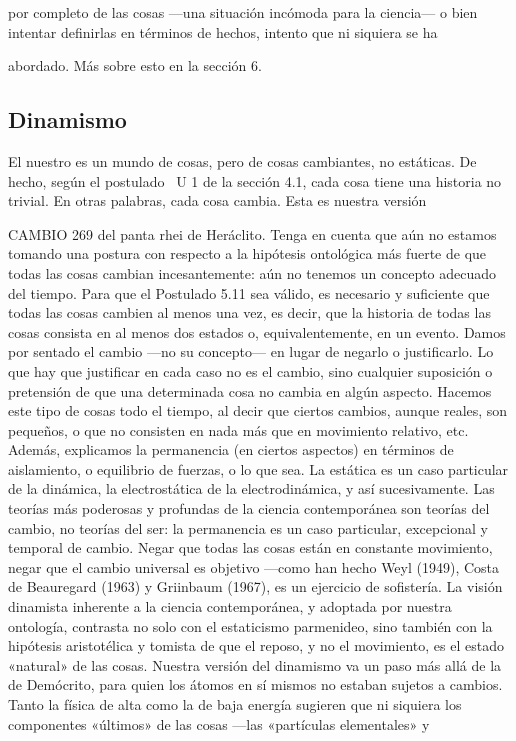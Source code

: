 \begin{justifying}
  por completo de las cosas —una situación incómoda para la ciencia— o bien intentar
  definirlas en términos de hechos, intento que ni siquiera se ha

  abordado. Más sobre esto en la sección 6.

      \noindent 
  \bigskip
  \subsection{Dinamismo}

  El nuestro es un mundo de cosas, pero de cosas cambiantes, no estáticas.
  De hecho, según el postulado ~U 1 de la sección 4.1, cada cosa tiene una
  historia no trivial. En otras palabras, cada cosa cambia. Esta es nuestra versión

  CAMBIO 269
  del panta rhei de Heráclito. Tenga en cuenta que aún no estamos tomando una postura
  con respecto a la hipótesis ontológica más fuerte de que todas las cosas cambian
  incesantemente: aún no tenemos un concepto adecuado del tiempo. Para que el Postulado
  5.11 sea válido, es necesario y suficiente que todas las cosas cambien al menos
  una vez, es decir, que la historia de todas las cosas consista en al menos dos estados o,
  equivalentemente, en un evento.
  Damos por sentado el cambio —no su concepto— en lugar de negarlo
  o justificarlo. Lo que hay que justificar en cada caso no es el cambio, sino
  cualquier suposición o pretensión de que una determinada cosa no
  cambia en algún aspecto. Hacemos este tipo de cosas todo el tiempo, al decir
  que ciertos cambios, aunque reales, son pequeños, o que no consisten en
  nada más que en movimiento relativo, etc. Además, explicamos la permanencia (en
  ciertos aspectos) en términos de aislamiento, o equilibrio de
  fuerzas, o lo que sea. La estática es un caso particular de la dinámica, la electrostática
  de la electrodinámica, y así sucesivamente. Las teorías más poderosas y profundas de la
  ciencia contemporánea son teorías del cambio, no teorías del ser:
  la permanencia es un caso particular, excepcional y temporal de cambio. Negar
  que todas las cosas están en constante movimiento, negar que el cambio universal es
  objetivo —como han hecho Weyl (1949), Costa de Beauregard (1963) y Griinbaum
  (1967), es un ejercicio de sofistería.
  La visión dinamista inherente a la ciencia contemporánea, y adoptada
  por nuestra ontología, contrasta no solo con el estaticismo parmenideo, sino también
  con la hipótesis aristotélica y tomista de que el reposo, y no
  el movimiento, es el estado «natural» de las cosas. Nuestra versión del dinamismo va
  un paso más allá de la de Demócrito, para quien los átomos en sí mismos
  no estaban sujetos a cambios. Tanto la física de alta como la de baja energía sugieren que ni
  siquiera los componentes «últimos» de las cosas —las «partículas elementales» y


\end{justifying}
